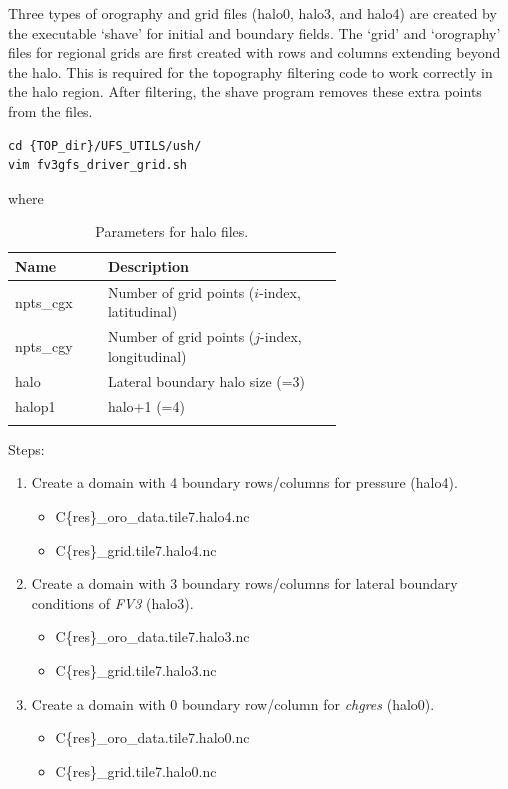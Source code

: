 \documentclass[11pt,fleqn]{report}              %
\begin{document}
Three types of orography and grid files (halo0, halo3, and halo4) are created by the executable `shave' for initial and boundary fields. The `grid' and `orography' files for regional grids are first created with rows and columns extending beyond the halo. This is required for the topography filtering code to work correctly in the halo region. After filtering, the shave program removes these extra points from the files.
\lstset{language=bash}   
\begin{lstlisting}[frame=trBL]
cd {TOP_dir}/UFS_UTILS/ush/
vim fv3gfs_driver_grid.sh
\end{lstlisting}
where
{
\fontsize{10}{12}\selectfont
\begin{longtable}{p{0.15\linewidth} | p{0.5\linewidth} }
\hline
\hline
Name & Description \\
\hline
 npts\_cgx & Number of grid points ($i$-index, latitudinal)  \\
 npts\_cgy & Number of grid points ($j$-index, longitudinal) \\
 halo & Lateral boundary halo size (=3) \\
 halop1 & halo+1 (=4)  \\
\hline
\caption{Parameters for halo files.}
\label{table:var_oro_sh}
\end{longtable}
}

Steps:
\begin{enumerate}
\item Create a domain with 4 boundary rows/columns for pressure (halo4).
\begin{itemize}
\item C\{res\}\_oro\_data.tile7.halo4.nc
\item C\{res\}\_grid.tile7.halo4.nc
\end{itemize}

\item Create a domain with 3 boundary rows/columns for lateral boundary conditions of {\it FV3} (halo3).
\begin{itemize}
\item C\{res\}\_oro\_data.tile7.halo3.nc
\item C\{res\}\_grid.tile7.halo3.nc
\end{itemize}

\item Create a domain with 0 boundary row/column for {\it chgres} (halo0).
\begin{itemize}
\item C\{res\}\_oro\_data.tile7.halo0.nc
\item C\{res\}\_grid.tile7.halo0.nc
\end{itemize}

\end{enumerate}
\end{document}

